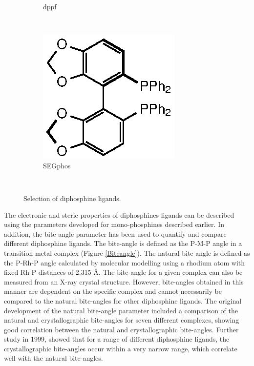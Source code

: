\begin{figure}[htbp]
\begin{subfigure}[b]{0.3\textwidth}
	\caption{dppf}
	\label{dppf}
\end{subfigure}
~
\begin{subfigure}[b]{0.3\textwidth}
	\centering
	\includegraphics{../Figures/Diphosphines/SEGphos.eps}
	\caption{SEGphos}
	\label{SEGphos}
\end{subfigure}
\\
\caption[Selection of diphosphine ligands]{Selection of diphosphine ligands.}
\label{diphosphineligands}
\end{figure}

The electronic and steric properties of diphosphines ligands can be described using the parameters developed for mono-phosphines described earlier.  In addition, the bite-angle parameter has been used to quantify and compare different diphosphine ligands.  The bite-angle is defined as the P-M-P angle in a transition metal complex (Figure \ref{Biteangle}).  The natural bite-angle is defined as the P-Rh-P angle calculated by molecular modelling using a rhodium atom with fixed Rh-P distances of 2.315 \si{\angstrom}.\cite{Casey1990}  The bite-angle for a given complex can also be measured from an X-ray crystal structure.  However, bite-angles obtained in this manner are dependent on the specific complex and cannot necessarily be compared to the natural bite-angles for other diphosphine ligands.  The original development of the natural bite-angle parameter included a comparison of the natural and crystallographic bite-angles for seven different complexes, showing good correlation between the natural and crystallographic bite-angles.\cite{Casey1990}  Further study in 1999, showed that for a range of different diphosphine ligands, the crystallographic bite-angles occur within a very narrow range, which correlate well with the natural bite-angles.\cite{Dierkes1999}

